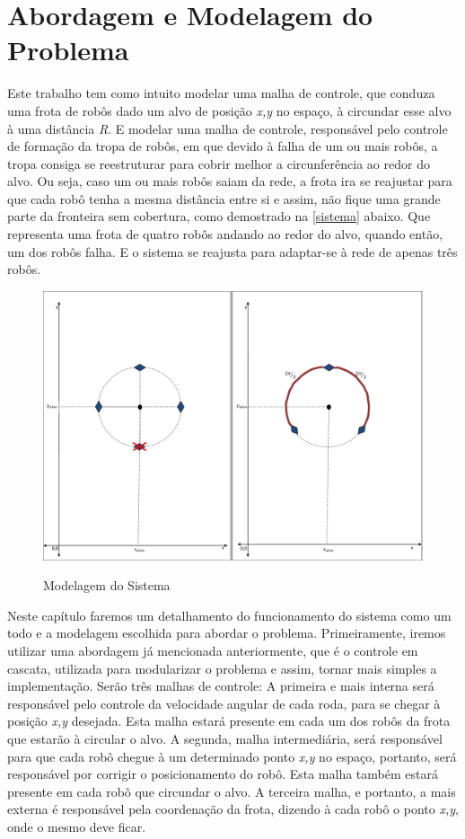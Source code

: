 %
%

\chapter{Abordagem e Modelagem do Problema}
\label{chap:abordagememdelo}
Este trabalho tem como intuito modelar uma malha de controle, que conduza uma frota de robôs dado um alvo de posição \emph{x,y} no espaço, à circundar esse alvo à uma distância \emph{R}. E modelar uma malha de controle, responsável pelo controle de formação da tropa de robôs, em que devido à falha de um ou mais robôs, a tropa consiga se reestruturar para cobrir melhor a circunferência ao redor do alvo. Ou seja, caso um ou mais robôs saiam da rede, a frota ira se reajustar para que cada robô tenha a mesma distância entre si e assim, não fique uma grande parte da fronteira sem cobertura, como demostrado na \autoref{sistema} abaixo. Que representa uma frota de quatro robôs andando ao redor do alvo, quando então, um dos robôs falha. E o sistema se reajusta para adaptar-se à rede de apenas três robôs.

\begin{figure}[!htb]
	\centering
	\caption{Modelagem do Sistema}
	\includegraphics[width=1.0\textwidth]{./04-figuras/sistema}
	\label{fig:sistema}
\end{figure}

Neste capítulo faremos um detalhamento do funcionamento do sistema como um todo e a modelagem escolhida para abordar o problema. Primeiramente, iremos utilizar uma abordagem já mencionada anteriormente, que é o controle em cascata, utilizada para modularizar o problema e assim, tornar mais simples a implementação. Serão três malhas de controle: A primeira e mais interna será responsável pelo controle da velocidade angular de cada roda, para se chegar à posição \emph{x,y} desejada. Esta malha estará presente em cada um dos robôs da frota que estarão à circular o alvo. A segunda, malha intermediária, será responsável para que cada robô chegue à um determinado ponto \emph{x,y} no espaço, portanto, será responsável por corrigir o posicionamento do robô. Esta malha também estará presente em cada robô que circundar o alvo. A terceira malha, e portanto, a mais externa é responsável pela coordenação da frota, dizendo à cada robô o ponto \emph{x,y}, onde o mesmo deve ficar.

